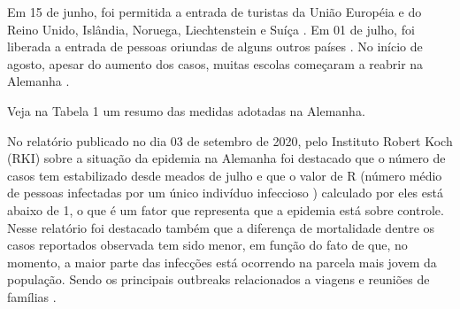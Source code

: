 \documentclass[12pt]{article}
\begin{document}
Em 15 de junho, foi permitida a entrada de turistas da União Européia  e do Reino Unido, Islândia, Noruega, Liechtenstein e Suíça \cite{dw}. Em 01 de julho, foi liberada a entrada de pessoas oriundas de alguns outros países \cite{sgvi}. No início de agosto, apesar do aumento dos casos, muitas escolas começaram a reabrir na Alemanha \cite{fortuneschool}.

\noindent Veja na Tabela 1 um resumo das medidas adotadas na Alemanha.


No relatório publicado no dia 03 de setembro de 2020, pelo Instituto Robert Koch (RKI) sobre a situação da epidemia na Alemanha foi destacado que o número de casos tem estabilizado desde meados de julho e que o valor de R (número médio de pessoas infectadas por um único indivíduo infeccioso \cite{RKI}) calculado por eles está abaixo de 1,  o que é um fator que representa que a epidemia está sobre controle. Nesse relatório foi destacado também que a diferença de mortalidade dentre os casos reportados observada tem sido menor, em função do fato de que, no momento, a maior parte das infecções está ocorrendo na parcela mais jovem da população. Sendo os principais outbreaks relacionados a viagens e reuniões de famílias \cite{RKI}.
\end{document}

